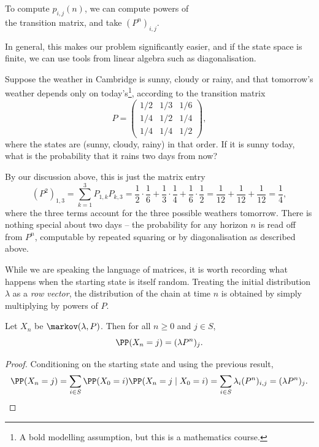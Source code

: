 \begin{center}
	\color{blue}
	To compute $p_{i, j}(n)$, we can compute powers of\\ the transition matrix, and take $(P^n)_{i, j}$.
\end{center}

In general, this makes our problem significantly easier, and if the state space is finite, we can use tools from linear algebra such as diagonalisation.

\begin{example}
	Suppose the weather in Cambridge is sunny, cloudy or rainy, and that tomorrow's weather depends only on today's\footnote{A bold modelling assumption, but this is a mathematics course.}, according to the transition matrix
	$$
	P = \begin{pmatrix}
		1/2 & 1/3 & 1/6 \\
		1/4 & 1/2 & 1/4 \\
		1/4 & 1/4 & 1/2
	\end{pmatrix},
	$$
	where the states are (sunny, cloudy, rainy) in that order. If it is sunny today, what is the probability that it rains two days from now?

	By our discussion above, this is just the matrix entry
	$$
	(P^2)_{1, 3} = \sum_{k = 1}^{3} P_{1, k}P_{k, 3} = \frac{1}{2}\cdot\frac{1}{6} + \frac{1}{3}\cdot\frac{1}{4} + \frac{1}{6}\cdot\frac{1}{2} = \frac{1}{12} + \frac{1}{12} + \frac{1}{12} = \frac{1}{4},
	$$
	where the three terms account for the three possible weathers tomorrow. There is nothing special about two days -- the probability for any horizon $n$ is read off from $P^n$, computable by repeated squaring or by diagonalisation as described above.
\end{example}

While we are speaking the language of matrices, it is worth recording what happens when the starting state is itself random. Treating the initial distribution $\lambda$ as a \emph{row vector}, the distribution of the chain at time $n$ is obtained by simply multiplying by powers of $P$.

\begin{proposition}
	Let $X_n$ be $\markov(\lambda, P)$. Then for all $n \geq 0$ and $j \in S$,
	$$
	\PP(X_n = j) = (\lambda P^n)_j.
	$$
\end{proposition}
\begin{proof}
	Conditioning on the starting state and using the previous result,
	$$
	\PP(X_n = j) = \sum_{i \in S} \PP(X_0 = i)\PP(X_n = j \mid X_0 = i) = \sum_{i \in S} \lambda_i (P^n)_{i, j} = (\lambda P^n)_j. \qedhere
	$$
\end{proof}

